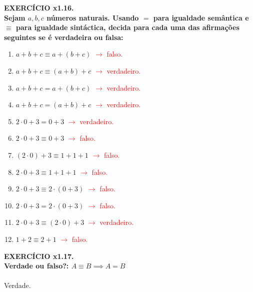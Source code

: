 \documentclass[a4paper, 12pt]{article}
\begin{document}
\noindent \textbf{EXERCÍCIO x1.16. \\
Sejam $a, b, c$ números naturais. Usando $=$ para igualdade semântica e $\equiv$ para igualdade
sintáctica, decida para cada uma das afirmações seguintes se é verdadeira ou falsa:}

\begin{enumerate}[($i$)]
    \item $a + b + c \equiv a + (b + c)$ \textcolor{red}{$\rightarrow$ falso.}
    \item $a + b + c \equiv (a + b) + c$ \textcolor{red}{$\rightarrow$ verdadeiro.}
    \item $a + b + c = a + (b + c)$ \textcolor{red}{$\rightarrow$ verdadeiro.}
    \item $a + b + c = (a + b) + c$ \textcolor{red}{$\rightarrow$ verdadeiro.}
    \item $2 \cdot 0 + 3 = 0 + 3$ \textcolor{red}{$\rightarrow$ verdadeiro.}
    \item $2 \cdot 0 + 3 \equiv 0 + 3$ \textcolor{red}{$\rightarrow$ falso.}
    \item $(2 \cdot 0) + 3 \equiv 1 + 1 + 1$ \textcolor{red}{$\rightarrow$ falso.}
    \item $2 \cdot 0 + 3 \equiv 1 + 1 + 1$ \textcolor{red}{$\rightarrow$ falso.}
    \item $2 \cdot 0 + 3 \equiv 2 \cdot (0 + 3)$ \textcolor{red}{$\rightarrow$ falso.}
    \item $2 \cdot 0 + 3 = 2 \cdot (0 + 3)$ \textcolor{red}{$\rightarrow$ falso.}
    \item $2 \cdot 0 + 3 \equiv (2 \cdot 0) + 3$ \textcolor{red}{$\rightarrow$ verdadeiro.}
    \item $1 + 2 \equiv 2 + 1$ \textcolor{red}{$\rightarrow$ falso.}
\end{enumerate}
\vspace{1cm}

\noindent \textbf{EXERCÍCIO x1.17. \\
Verdade ou falso?: $A \equiv B \implies A = B$
} \\ \\
Verdade. \\ \\
\end{document}
